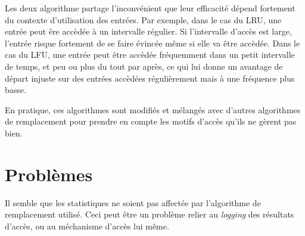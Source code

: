\documentclass{article}
\begin{document}
Les deux algorithme partage l'inconvénient que leur efficacité dépend fortement du contexte d'utilisation des entrées. Par exemple, dans le cas du LRU, une entrée peut êre accèdée à un intervalle régulier. Si l'intervalle d'accès est large, l'entrée risque fortement de se faire évincée même si elle va être accèdée.
Dans le cas du LFU, une entrée peut être accèdée fréquemment dans un petit intervalle de temps, et peu ou plus du tout par après, ce qui lui donne un avantage de départ injuste sur des entrées accèdées régulièrement mais à une fréquence plus basse.

En pratique, ces algorithmes sont modifiés et mélangés avec d'autres algorithmes de remplacement pour prendre en compte les motifs d'accès qu'ils ne gèrent pas bien.

\section{Problèmes}
Il semble que les statistiques ne soient pas affectée par l'algorithme de remplacement utilisé. Ceci peut être un problème relier au \emph{logging} des résultats d'accès, ou au méchanisme d'accès lui même.
\end{document}
